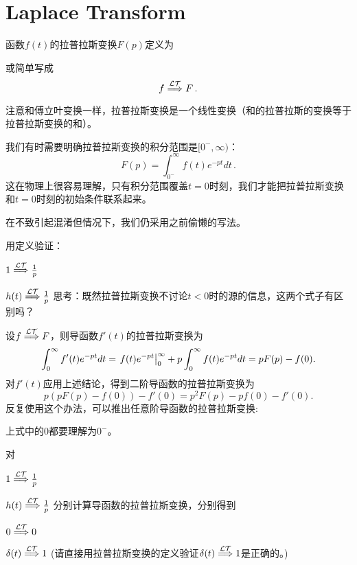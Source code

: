 \documentclass[CJK]{beamer}
\begin{document}
\section{Laplace Transform}


\begin{frame}
\bch
函数$f(t)$的拉普拉斯变换$F(p)$定义为

  或简单写成
  {\blue  $$ f \stackrel{\mathcal{LT}}{\Longrightarrow} F\,. $$}

  注意和傅立叶变换一样，拉普拉斯变换是一个线性变换（和的拉普拉斯的变换等于拉普拉斯变换的和）。


\ech
\end{frame}


\begin{frame}
  \bch
  我们有时需要明确拉普拉斯变换的积分范围是$[0^-,\infty)$：
    {\blue $$F(p) = \int_{0^-}^\infty f(t) e^{-pt} dt\,.$$}
    这在物理上很容易理解，只有积分范围覆盖$t=0$时刻，我们才能把拉普拉斯变换和$t=0$时刻的初始条件联系起来。


    \skiplines
    
  在不致引起混淆但情况下，我们仍采用之前偷懒的写法。

  \ech
\end{frame}

\begin{frame}
  \bch
  
  用定义验证：
  \bitem
\item{\blue $1 \stackrel{\mathcal{LT}}{\Longrightarrow} \frac{1}{p} $}
\item{\blue $h(t) \stackrel{\mathcal{LT}}{\Longrightarrow} \frac{1}{p} $}  
  \eitem
  思考：既然拉普拉斯变换不讨论$t<0$时的源的信息，这两个式子有区别吗？
  \ech
\end{frame}

\begin{frame}
\bch
设$f \stackrel{\mathcal{LT}}{\Longrightarrow} F$，则导函数$f'(t)$的拉普拉斯变换为
$$ \int_0^\infty f'(t) e^{-pt} dt =\left.f(t)e^{-pt}\right\vert_0^\infty + p \int_0^\infty f(t)e^{-pt} dt = pF(p) - f(0). $$
对$f'(t)$应用上述结论，得到二阶导函数的拉普拉斯变换为
$$ p(pF(p) - f(0)) - f'(0) = p^2F(p) - pf(0) - f'(0).$$
反复使用这个办法，可以推出任意阶导函数的拉普拉斯变换:

{\blue 上式中的$0$都要理解为$0^-$。}
\ech
\end{frame}

\begin{frame}
  \bch
  对
  \bitem
\item{\blue $1 \stackrel{\mathcal{LT}}{\Longrightarrow} \frac{1}{p} $}
\item{\blue $h(t) \stackrel{\mathcal{LT}}{\Longrightarrow} \frac{1}{p} $}  
  \eitem
  分别计算导函数的拉普拉斯变换，分别得到
  \bitem
\item{\blue $0 \stackrel{\mathcal{LT}}{\Longrightarrow} 0 $}
\item{\blue $\delta(t) \stackrel{\mathcal{LT}}{\Longrightarrow} 1 $}  
  \eitem
  (请直接用拉普拉斯变换的定义验证$\delta(t)\stackrel{\mathcal{LT}}{\Longrightarrow} 1$是正确的。)

  \ech
\end{frame}
\end{document}
